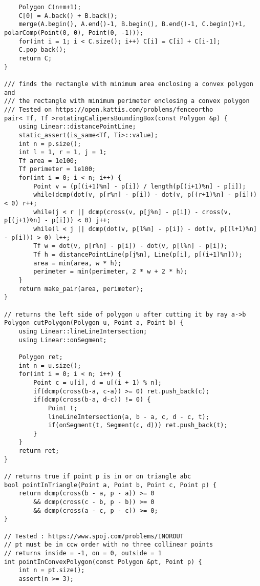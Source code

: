 \documentclass[FSZ,a4paper,onesided]{article}
\begin{document}
\begin{multicols*}{\COLS}
\begin{lstlisting}
    Polygon C(n+m+1);
    C[0] = A.back() + B.back();
    merge(A.begin(), A.end()-1, B.begin(), B.end()-1, C.begin()+1, polarComp(Point(0, 0), Point(0, -1)));
    for(int i = 1; i < C.size(); i++) C[i] = C[i] + C[i-1];
    C.pop_back();
    return C;
}

/// finds the rectangle with minimum area enclosing a convex polygon and
/// the rectangle with minimum perimeter enclosing a convex polygon
/// Tested on https://open.kattis.com/problems/fenceortho
pair< Tf, Tf >rotatingCalipersBoundingBox(const Polygon &p) {
    using Linear::distancePointLine;
    static_assert(is_same<Tf, Ti>::value);
    int n = p.size();
    int l = 1, r = 1, j = 1;
    Tf area = 1e100;
    Tf perimeter = 1e100;
    for(int i = 0; i < n; i++) {
        Point v = (p[(i+1)%n] - p[i]) / length(p[(i+1)%n] - p[i]);
        while(dcmp(dot(v, p[r%n] - p[i]) - dot(v, p[(r+1)%n] - p[i])) < 0) r++;
        while(j < r || dcmp(cross(v, p[j%n] - p[i]) - cross(v, p[(j+1)%n] - p[i])) < 0) j++;
        while(l < j || dcmp(dot(v, p[l%n] - p[i]) - dot(v, p[(l+1)%n] - p[i])) > 0) l++;
        Tf w = dot(v, p[r%n] - p[i]) - dot(v, p[l%n] - p[i]);
        Tf h = distancePointLine(p[j%n], Line(p[i], p[(i+1)%n]));
        area = min(area, w * h);
        perimeter = min(perimeter, 2 * w + 2 * h);
    }
    return make_pair(area, perimeter);
}

// returns the left side of polygon u after cutting it by ray a->b
Polygon cutPolygon(Polygon u, Point a, Point b) {
    using Linear::lineLineIntersection;
    using Linear::onSegment;

    Polygon ret;
    int n = u.size();
    for(int i = 0; i < n; i++) {
        Point c = u[i], d = u[(i + 1) % n];
        if(dcmp(cross(b-a, c-a)) >= 0) ret.push_back(c);
        if(dcmp(cross(b-a, d-c)) != 0) {
            Point t;
            lineLineIntersection(a, b - a, c, d - c, t);
            if(onSegment(t, Segment(c, d))) ret.push_back(t);
        }
    }
    return ret;
}

// returns true if point p is in or on triangle abc
bool pointInTriangle(Point a, Point b, Point c, Point p) {
    return dcmp(cross(b - a, p - a)) >= 0
        && dcmp(cross(c - b, p - b)) >= 0
        && dcmp(cross(a - c, p - c)) >= 0;
}

// Tested : https://www.spoj.com/problems/INOROUT
// pt must be in ccw order with no three collinear points
// returns inside = -1, on = 0, outside = 1
int pointInConvexPolygon(const Polygon &pt, Point p) {
    int n = pt.size();
    assert(n >= 3);


\end{lstlisting}
\end{multicols*}
\end{document}
